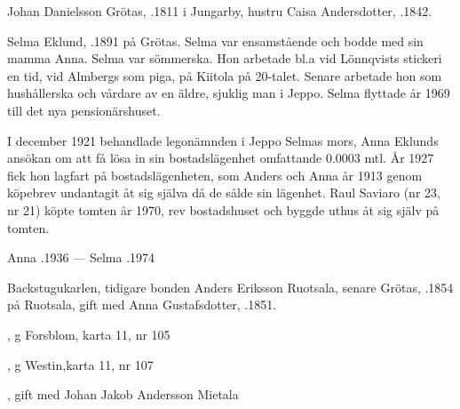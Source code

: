%
Johan Danielsson Grötas, .1811 i Jungarby, hustru Caisa Andersdotter, .1842.



%


%
Selma Eklund, .1891 på Grötas. Selma var ensamstående och bodde med sin mamma Anna. Selma var sömmerska. Hon arbetade bl.a vid Lönnqvists stickeri en tid, vid Almbergs som piga, på Kiitola på 20-talet. Senare arbetade hon som hushållerska och vårdare av en äldre, sjuklig man i Jeppo. Selma flyttade år 1969 till det nya pensionärshuset.

I december 1921 behandlade legonämnden i Jeppo Selmas mors, Anna Eklunds ansökan om att få lösa in sin bostadslägenhet omfattande 0.0003 mtl. År 1927 fick hon lagfart på bostadslägenheten, som Anders och Anna år 1913 genom köpebrev undantagit  åt sig själva då de sålde sin lägenhet. Raul Saviaro (nr 23, nr 21) köpte tomten år 1970, rev bostadshuset och byggde uthus åt sig själv på tomten.

Anna .1936  ---  Selma .1974


%
Backstugukarlen, tidigare bonden Anders Eriksson Ruotsala, senare Grötas, .1854 på Ruotsala, gift med Anna Gustafsdotter, .1851.
\begin{jhchildren}
  \item {}, g Forsblom, karta 11, nr 105
  \item {}, g Westin,karta 11, nr 107
  \item {}
  \item {}
  \item {}, gift med Johan Jakob Andersson Mietala
  \item {}
  \item {}
\end{jhchildren}

